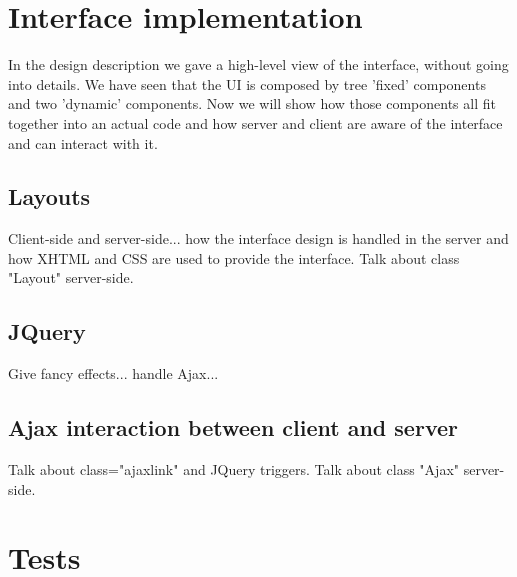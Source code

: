 \documentclass[12pt]{report}
\begin{document}
\section{Interface implementation}
In the design description we gave a high-level view of the interface, without going into details. We have seen that the UI is composed by tree 'fixed' components and two 'dynamic' components. Now we will show how those components all fit together into an actual code and how server and client are aware of the interface and can interact with it.

\subsection{Layouts}
Client-side and server-side... how the interface design is handled in the server and how XHTML and CSS are used to provide the interface. Talk about class "Layout" server-side.
\subsection{JQuery}
Give fancy effects... handle Ajax... 
\subsection{Ajax interaction between client and server}
Talk about class="ajaxlink" and JQuery triggers. Talk about class "Ajax" server-side.

\section{Tests}
\end{document}
